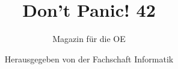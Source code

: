 \begin{titlepage}

\thispagestyle{empty}
\title{\Huge{Don't Panic! 42}}
\author{Magazin für die OE \semester{} \the\year{}}
\date{Herausgegeben von der Fachschaft Informatik}


%

\maketitle
\newpage
\end{titlepage}
